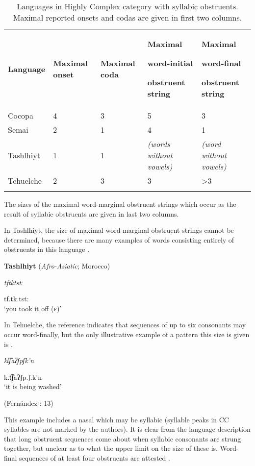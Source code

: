 \begin{table}
\begin{tabularx}{\textwidth}{XXXXX}
\lsptoprule

\textbf{Language} & \textbf{Maximal onset} & \textbf{Maximal coda} & { \textbf{Maximal} }

{ \textbf{word-initial} }

 \textbf{obstruent string} & { \textbf{Maximal} }

{ \textbf{word-final} }

 \textbf{obstruent string}\\
Cocopa & 4 & 3 & 5 & 3\\
Semai & 2 & 1 & 4 & 1\\
Tashlhiyt & 1 & 1 & \textit{(words without vowels)} & \textit{(word without vowels)}\\
Tehuelche & 2 & 3 & 3 & >3\\
\lspbottomrule
\end{tabularx}
\caption{\label{tab:3.1}Languages in Highly Complex category with syllabic obstruents. Maximal reported onsets and codas are given in first two columns.}The sizes of the maximal word-marginal obstruent strings which occur as the result of syllabic obstruents are given in last two columns.
\end{table}

  In Tashlhiyt, the size of maximal word-marginal obstruent strings cannot be determined, because there are many examples of words consisting entirely of obstruents in this language . 

\ea\label{ex:3.12}
  \textbf{Tashlhiyt} (\textit{Afro-Asiatic}; Morocco)

\textit{tftktstː}

tf.tk.tstː\\
\glt ‘you took it off (\textsc{f})’
\citep[332]{Ridouane2008}
\z

In Tehuelche, the reference indicates that sequences of up to six consonants may occur word-finally, but the only illustrative example of a pattern this size is given is .

\ea\label{ex:3.13}

\textit{kt͡ʃaʔʃpʃk’n}

k.t͡ʃaʔʃp.ʃ.k’n\\
\glt ‘it is being washed’

(Fernández \citealt{GarayHernández2006}: 13)
\z

This example includes a nasal which may be syllabic (syllable peaks in CC syllables are not marked by the authors). It is clear from the language description that long obstruent sequences come about when syllabic consonants are strung together, but unclear as to what the upper limit on the size of these is. Word-final sequences of at least four obstruents are attested .

